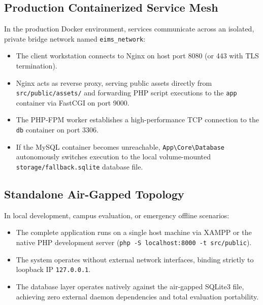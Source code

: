\subsection{Production Containerized Service Mesh}
In the production Docker environment, services communicate across an isolated, private bridge network named \texttt{eims\_network}:
\begin{itemize}
    \item The client workstation connects to Nginx on host port 8080 (or 443 with TLS termination).
    \item Nginx acts as reverse proxy, serving public assets directly from \texttt{src/public/assets/} and forwarding PHP script executions to the \texttt{app} container via FastCGI on port 9000.
    \item The PHP-FPM worker establishes a high-performance TCP connection to the \texttt{db} container on port 3306.
    \item If the MySQL container becomes unreachable, \texttt{App\textbackslash Core\textbackslash Database} autonomously switches execution to the local volume-mounted \texttt{storage/fallback.sqlite} database file.
\end{itemize}

\subsection{Standalone Air-Gapped Topology}
In local development, campus evaluation, or emergency offline scenarios:
\begin{itemize}
    \item The complete application runs on a single host machine via XAMPP or the native PHP development server (\texttt{php -S localhost:8000 -t src/public}).
    \item The system operates without external network interfaces, binding strictly to loopback IP \texttt{127.0.0.1}.
    \item The database layer operates natively against the air-gapped SQLite3 file, achieving zero external daemon dependencies and total evaluation portability.
\end{itemize}

